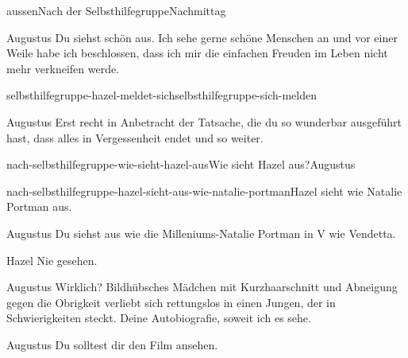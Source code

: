 \documentclass[12pt]{article}
\begin{document}
\begin{scene}[cut to]{aussen}{Nach der Selbsthilfegruppe}{Nachmittag}
        \begin{dialog}{Augustus}
            Du siehst schön aus.
            Ich sehe gerne schöne Menschen an und vor einer Weile habe ich beschlossen, dass ich mir die einfachen Freuden im Leben nicht mehr verkneifen werde.
        \end{dialog}


        \begin{conditional}{selbsthilfegruppe-hazel-meldet-sich}{selbsthilfegruppe-sich-melden}
            \begin{dialog}{Augustus}
                Erst recht in Anbetracht der Tatsache, die du so wunderbar ausgeführt hast, dass alles in Vergessenheit endet und so weiter.
            \end{dialog}
        \end{conditional}

        \begin{decision}{nach-selbsthilfegruppe-wie-sieht-hazel-aus}{Wie sieht \gls{Hazel} aus?}{\gls{Augustus}}
            \begin{option}{nach-selbsthilfegruppe-hazel-sieht-aus-wie-natalie-portman}{\gls{Hazel} sieht wie Natalie Portman aus.}
                \begin{dialog}{Augustus}
                    Du siehst aus wie die Milleniums-Natalie Portman in V wie Vendetta.
                \end{dialog}

                \begin{dialog}{Hazel}
                    Nie gesehen.
                \end{dialog}

                \begin{dialog}{Augustus}
                    Wirklich?
                    Bildhübsches Mädchen mit Kurzhaarschnitt und Abneigung gegen die Obrigkeit verliebt sich rettungslos in einen Jungen, der in Schwierigkeiten steckt.
                    Deine Autobiografie, soweit ich es sehe.
                \end{dialog}
            \end{option}
        \end{decision}

        \begin{dialog}{Augustus}
            Du solltest dir den Film ansehen.
        \end{dialog}


\end{scene}
\end{document}
